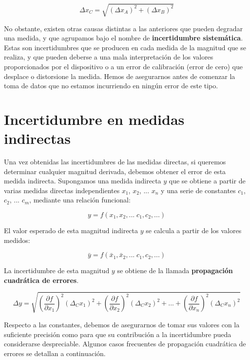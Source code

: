 \documentclass{book}
\begin{document}
\begin{equation}
  \Delta x_C = \sqrt{(\Delta x_A)^2 + (\Delta x_B)^2}
\end{equation}

No obstante, existen otras causas distintas a las anteriores que pueden degradar una medida, y
que agrupamos bajo el nombre de \textbf{incertidumbre sistemática}. Estas son incertidumbres que se producen
en cada medida de la magnitud que se realiza, y que pueden deberse a una mala interpretación de
los valores proporcionados por el dispositivo o a un error de calibración (error de cero) que
desplace o distorsione la medida. Hemos de asegurarnos antes de comenzar la toma de datos que no
estamos incurriendo en ningún error de este tipo.

\section{Incertidumbre en medidas indirectas}

Una vez obtenidas las incertidumbres de las medidas directas, si queremos determinar cualquier
magnitud derivada, debemos obtener el error de esta medida indirecta. Supongamos una medida
indirecta $y$ que se obtiene a partir de varias medidas directas independientes $x_1$, $x_2$, 
... $x_n$  y una serie de constantes $c_1$, $c_2$, ... $c_m$, mediante una relación funcional:

\begin{equation}
  y = f(x_1, x_2, ... \; c_1, c_2, ...)
\end{equation}

El valor esperado de esta magnitud indirecta $y$ se calcula a partir de los valores medidos:

\begin{equation}
  \bar{y} = f(\bar{x}_1, \bar{x}_2, ... \; c_1, c_2, ...)
\end{equation}

La incertidumbre de esta magnitud $y$ se obtiene de la llamada \textbf{propagación cuadrática de 
errores}.

\begin{equation}
  \Delta y = \sqrt{ \left( \frac{\partial f}{\partial x_1} \right)^2 (\Delta_C x_1)^2 + 
  \left( \frac{\partial f}{\partial x_2} \right)^2 (\Delta_C x_2)^2 + ... +
  \left( \frac{\partial f}{\partial x_n} \right)^2 (\Delta_C x_n)^2}
\end{equation}

Respecto a las constantes, debemos de asegurarnos de tomar sus valores con la suficiente precisión
como para que su contribución a la incertidumbre pueda considerarse despreciable. Algunos casos
frecuentes de propagación cuadrática de errores se detallan a continuación.
\end{document}
